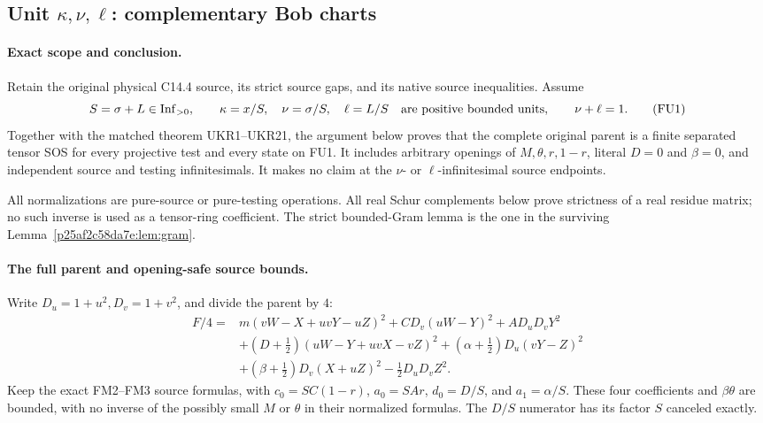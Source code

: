 \subsection{Unit $\kappa,\nu,\ell$: complementary Bob charts}

\label{component:p3f02c51074be}

\label{p3f02c51074be:sec:new-c144-unit-kappa-all-tests}

\paragraph{Exact scope and conclusion.}
Retain the original physical C14.4 source, its strict source gaps,
and its native source inequalities. Assume
\[
 S=\sigma+L\in\operatorname{Inf}_{>0},\qquad
 \kappa=x/S,\quad\nu=\sigma/S,\quad\ell=L/S
 \quad\hbox{are positive bounded units},\qquad\nu+\ell=1.
 \tag{FU1}
\]
Together with the matched theorem UKR1--UKR21, the argument below
proves that the complete original parent is a finite separated tensor
SOS for every projective test and every state on FU1. It includes
arbitrary openings of $M,\theta,r,1-r$, literal $D=0$ and $\beta=0$,
and independent source and testing infinitesimals. It makes no claim
at the $\nu$- or $\ell$-infinitesimal source endpoints.

All normalizations are pure-source or pure-testing operations.
All real Schur complements below prove strictness of a real residue
matrix; no such inverse is used as a tensor-ring coefficient. The
strict bounded-Gram lemma is the one in the surviving
Lemma~\ref{p25af2c58da7e:lem:gram}.

\paragraph{The full parent and opening-safe source bounds.}
Write $D_u=1+u^2,D_v=1+v^2$, and divide the parent by $4$:
\[
\begin{split}
 F/4={}&m(vW-X+uvY-uZ)^2+CD_v(uW-Y)^2+AD_uD_vY^2\\
 &+(D+\tfrac12)(uW-Y+uvX-vZ)^2
 +(\alpha+\tfrac12)D_u(vY-Z)^2\\
 &+(\beta+\tfrac12)D_v(X+uZ)^2-\tfrac12D_uD_vZ^2.
\end{split}\tag{FU2}
\]
Keep the exact FM2--FM3 source formulas, with
$c_0=SC(1-r)$, $a_0=SAr$, $d_0=D/S$, and $a_1=\alpha/S$.
These four coefficients and $\beta\theta$ are bounded, with no
inverse of the possibly small $M$ or $\theta$ in their normalized
formulas. The $D/S$ numerator has its factor $S$ canceled exactly.

